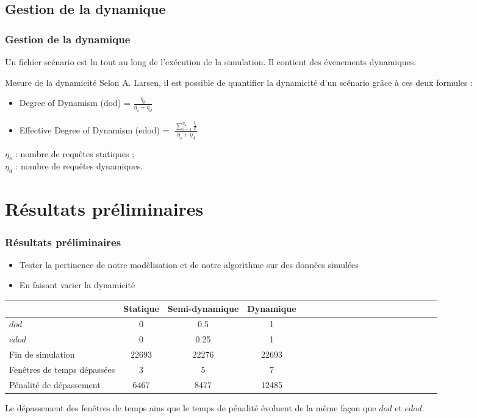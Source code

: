 \documentclass{beamer}
\begin{document}
\subsection*{Gestion de la dynamique}
\begin{frame}

 \frametitle{Gestion de la dynamique}
Un fichier scénario est lu tout au long de l'exécution de la simulation. Il contient des évenements dynamiques.

\begin{block}{Mesure de la dynamicité}
Selon A. Larsen\cite{Larsen00}, il est possible de quantifier la dynamicité d'un scénario grâce à ces deux formules : 
  \begin{itemize}
  \item Degree of Dynamism (dod) = $\frac{\eta_d}{\eta_s+\eta_d}$
  \item Effective Degree of Dynamism (edod) = $\; \frac{\sum_{i=1}^{\eta_d}\frac{t_i}{T}}{\eta_s+\eta_d}$
\end{itemize}

$\eta_s$ : nombre de requêtes statiques ; \\
$\eta_d$ : nombre de requêtes dynamiques.

\end{block}
\end{frame}


\section{Résultats préliminaires}
\begin{frame}
\frametitle{Résultats préliminaires}
\begin{itemize}
 \item Tester la pertinence de notre modèlisation et de notre algorithme sur des données simulées
 \item En faisant varier la dynamicité
\end{itemize}

\small
\begin{center}
	\begin{tabular}{*{5}{|l|c|c|c}}
		\hline
						& Statique& Semi-dynamique & Dynamique \\
		\hline
		$dod$				& 0 	&0.5 	& 1 	 \\
		$edod$				& 0 	&0.25	& 1 	\\
		\hline
		Fin de simulation		&22693	& 22276	& 22693   \\
		\hline		
		Fenêtres de temps dépassées	&3	&5 	& 7 \\
		\hline		
		Pénalité de dépassement		&6467	&8477	& 12485\\
		\hline
	
	\end{tabular}
\end{center}
\normalsize

Le dépassement des fenêtres de temps ains que le temps de pénalité évoluent de la même façon que $dod$ et $edod$.

\end{frame}
\end{document}
